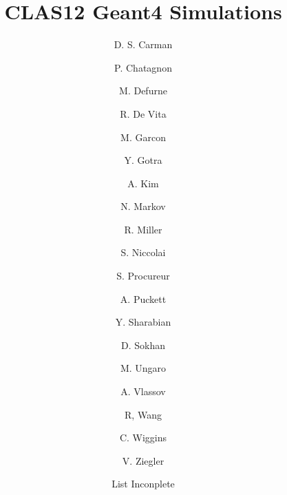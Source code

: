 \title{CLAS12 Geant4 Simulations}




\author[A]{D. S. Carman}
\author[E]{P. Chatagnon}
\author[C]{M. Defurne}
\author[B]{R. De Vita}
\author[C]{M. Garcon}
\author[A]{Y. Gotra}
\author[D]{A. Kim}
\author[D]{N. Markov}
\author[A]{R. Miller}
\author[E]{S. Niccolai}
\author[C]{S. Procureur}
\author[D]{A. Puckett}
\author[A]{Y. Sharabian}
\author[F]{D. Sokhan}
\author[A]{M. Ungaro}
\author[G]{A. Vlassov}
\author[E]{R, Wang}
\author[A]{C. Wiggins}
\author[A]{V. Ziegler}
\author[A]{List Inconplete}

\address[A]{Thomas Jefferson National Accelerator Facility, Newport News, VA, USA}
\address[B]{Istituto Nazionale Di Fisica Nucleare, Genova, Italy}
\address[C]{IRFU, CEA, Universit\`e Paris-Saclay, F-91191 Gif-sur-Yvette, France}
\address[D]{University of Connecticut, Storrs, Connecticut}
\address[E]{Institut de Physique Nuclaire, CNRS-IN2P3, Univ. Paris-Sud, Universit Paris-Saclay, 91406 Orsay Cedex, France}
\address[F]{University of Glasgow, Glasgow G12 8QQ, United Kingdom }
\address[G]{Institute For Theoretical & Experimental Physics, Moscow, Russia}
